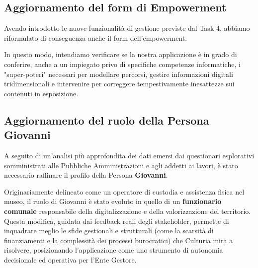 \subsection{Aggiornamento del form di Empowerment}
Avendo introdotto le nuove funzionalità di gestione previste dal Task 4, abbiamo riformulato di conseguenza anche il form dell'empowerment. 

In questo modo, intendiamo verificare se la nostra applicazione è in grado di conferire, anche a un impiegato privo di specifiche competenze informatiche, i "super-poteri" necessari per modellare percorsi, gestire informazioni digitali tridimensionali e intervenire per correggere tempestivamente inesattezze sui contenuti in esposizione.

\subsection{Aggiornamento del ruolo della Persona Giovanni}
A seguito di un'analisi più approfondita dei dati emersi dai questionari esplorativi somministrati alle Pubbliche Amministrazioni e agli addetti ai lavori, è stato necessario raffinare il profilo della Persona \textbf{Giovanni}. 

Originariamente delineato come un operatore di custodia e assistenza fisica nel museo, il ruolo di Giovanni è stato evoluto in quello di un \textbf{funzionario comunale} responsabile della digitalizzazione e della valorizzazione del territorio. Questa modifica, guidata dai feedback reali degli stakeholder, permette di inquadrare meglio le sfide gestionali e strutturali (come la scarsità di finanziamenti e la complessità dei processi burocratici) che Culturia mira a risolvere, posizionando l'applicazione come uno strumento di autonomia decisionale ed operativa per l'Ente Gestore.

